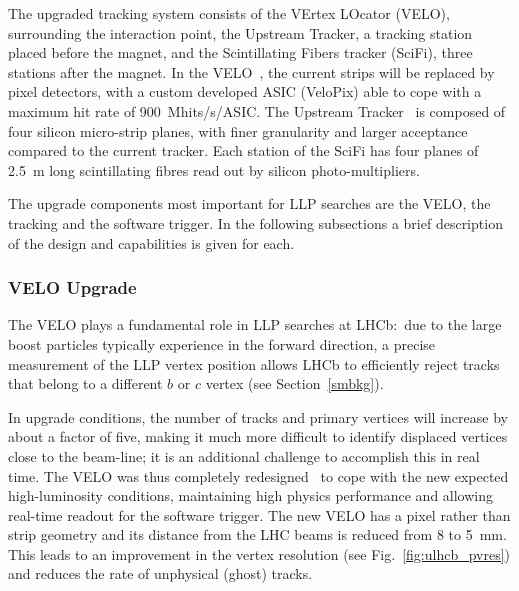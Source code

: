 The upgraded tracking system consists of the VErtex LOcator (VELO), surrounding the interaction point, the Upstream Tracker, a tracking station placed before the magnet, and the Scintillating Fibers tracker (SciFi), three stations after the magnet. In the VELO~\cite{LHCb-TDR-013}, the current strips will be replaced by pixel detectors, with a custom developed ASIC (VeloPix) able to cope with a maximum hit rate of 900~Mhits/s/ASIC. The Upstream Tracker~\cite{LHCb-TDR-015} is composed of four silicon micro-strip planes, with finer granularity and larger acceptance compared to the current tracker. Each station of the SciFi has four planes of 2.5~m long scintillating fibres read out by silicon photo-multipliers.

The upgrade components most important for LLP searches are the VELO, the tracking and the software trigger. In the following subsections a brief description of the design and capabilities is given for each.

\subsubsection{VELO Upgrade}

The VELO plays a fundamental role in LLP searches at LHCb:~due to the large boost particles typically experience in the forward direction, a precise measurement of the LLP vertex position allows LHCb to efficiently reject tracks that belong to a different $b$ or $c$ vertex (see Section~\ref{smbkg}).   

In upgrade conditions, the number of tracks and primary vertices will increase by about a factor of five, making it much more difficult to identify displaced vertices close to the beam-line; it is an additional challenge to accomplish this in real time. The VELO was thus completely redesigned~\cite{LHCb-TDR-013} to cope with the new expected high-luminosity conditions, maintaining high physics performance and allowing real-time readout for the software trigger. The new VELO has a pixel rather than strip geometry and its distance from the LHC beams is reduced from 8 to 5~mm. This leads to an improvement in the vertex resolution (see Fig.~\ref{fig:ulhcb_pvres}) and reduces the rate of unphysical (ghost) tracks.

